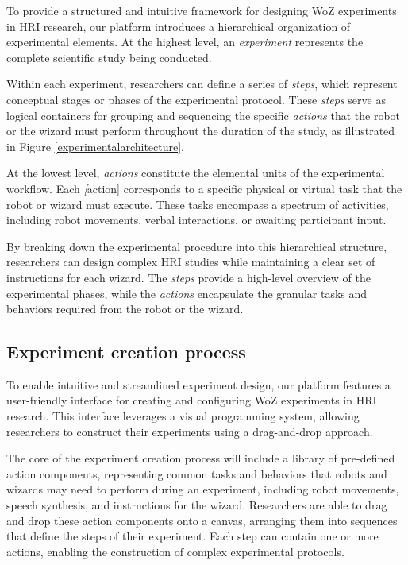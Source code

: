 \documentclass[letterpaper, 10 pt, conference]{ieeeconf}
\begin{document}
To provide a structured and intuitive framework for designing WoZ experiments in HRI research, our platform introduces a hierarchical organization of experimental elements. At the highest level, an \textit{experiment} represents the complete scientific study being conducted. 

Within each experiment, researchers can define a series of \textit{steps}, which represent conceptual stages or phases of the experimental protocol. These \textit{steps} serve as logical containers for grouping and sequencing the specific \textit{actions} that the robot or the wizard must perform throughout the duration of the study, as illustrated in Figure \ref{experimentalarchitecture}.

At the lowest level, \textit{actions} constitute the elemental units of the experimental workflow. Each \textit[action] corresponds to a specific physical or virtual task that the robot or wizard must execute. These tasks encompass a spectrum of activities, including robot movements, verbal interactions, or awaiting participant input.

By breaking down the experimental procedure into this hierarchical structure, researchers can design complex HRI studies while maintaining a clear set of instructions for each wizard. The \textit{steps} provide a high-level overview of the experimental phases, while the \textit{actions} encapsulate the granular tasks and behaviors required from the robot or the wizard.

\subsection{Experiment creation process} 

To enable intuitive and streamlined experiment design, our platform features a user-friendly interface for creating and configuring WoZ experiments in HRI research. This interface leverages a visual programming system, allowing researchers to construct their experiments using a drag-and-drop approach.

The core of the experiment creation process will include a library of pre-defined action components, representing common tasks and behaviors that robots and wizards may need to perform during an experiment, including robot movements, speech synthesis, and instructions for the wizard. Researchers are able to drag and drop these action components onto a canvas, arranging them into sequences that define the steps of their experiment. Each step can contain one or more actions, enabling the construction of complex experimental protocols.
\end{document}
